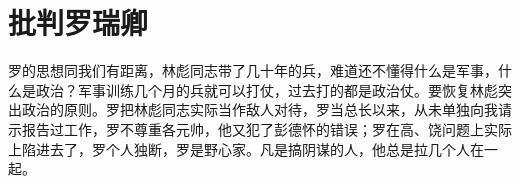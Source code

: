 \section[批判罗瑞卿（一九六五年十二月二日）]{批判罗瑞卿}


罗的思想同我们有距离，林彪同志带了几十年的兵，难道还不懂得什么是军事，什么是政治？军事训练几个月的兵就可以打仗，过去打的都是政治仗。要恢复林彪突出政治的原则。罗把林彪同志实际当作敌人对待，罗当总长以来，从未单独向我请示报告过工作，罗不尊重各元帅，他又犯了彭德怀的错误；罗在高、饶问题上实际上陷进去了，罗个人独断，罗是野心家。凡是搞阴谋的人，他总是拉几个人在一起。

